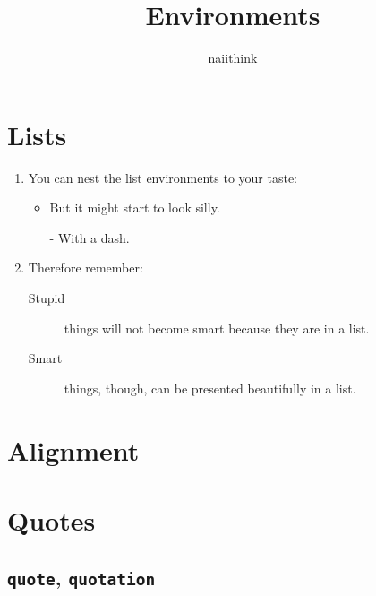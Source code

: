 \documentclass[a4paper]{article}
\title{Environments}
\author{naiithink}
\date{}
\begin{document}
\begin{titlepage}
\maketitle
\thispagestyle{empty}
\tableofcontents
\end{titlepage}

\newpage
\section{Lists}
\begin{flushleft}
\begin{enumerate}
\item You can nest the list
environments to your taste:
\begin{itemize}
\item But it might start to
look silly.
\item[-] With a dash.
\end{itemize}
\item Therefore remember:
\begin{description}
\item[Stupid] things will not
become smart because they are
in a list.
\item[Smart] things, though,
can be presented beautifully
in a list.
\end{description}
\end{enumerate}
\end{flushleft}

\newpage
\section{Alignment}
\begin{flushleft}
\blindtext
\end{flushleft}

\begin{center}
\blindtext
\end{center}

\begin{flushright}
\blindtext
\end{flushright}

\newpage
\section{Quotes}

\subsection{\texttt{quote}, \texttt{quotation}}
\end{document}
